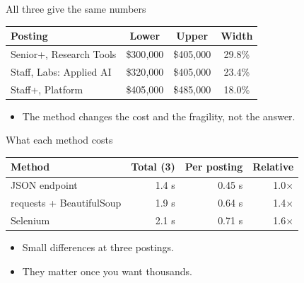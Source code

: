 \documentclass[11pt,aspectratio=169]{beamer}
\newenvironment{wideitemize}
  {\begin{itemize}\setlength{\itemsep}{10pt}}
  {\end{itemize}}
\begin{document}
\begin{frame}{All three give the same numbers}
\begin{table}
\centering\small
\begin{tabular}{lccc}
\toprule
Posting & Lower & Upper & Width \\
\midrule
Senior+, Research Tools & \$300{,}000 & \$405{,}000 & 29.8\% \\
Staff, Labs: Applied AI & \$320{,}000 & \$405{,}000 & 23.4\% \\
Staff+, Platform        & \$405{,}000 & \$485{,}000 & 18.0\% \\
\bottomrule
\end{tabular}
\end{table}

\vspace{0.5em}
\begin{wideitemize}
  \item The method changes the cost and the fragility, not the answer.
\end{wideitemize}
\end{frame}

\begin{frame}{What each method costs}
\begin{table}
\centering\small
\begin{tabular}{lrrr}
\toprule
Method & Total (3) & Per posting & Relative \\
\midrule
JSON endpoint            & 1.4 s & 0.45 s & 1.0$\times$ \\
requests + BeautifulSoup & 1.9 s & 0.64 s & 1.4$\times$ \\
Selenium                 & 2.1 s & 0.71 s & 1.6$\times$ \\
\bottomrule
\end{tabular}
\end{table}

\vspace{0.5em}
\begin{wideitemize}
  \item Small differences at three postings.
  \item They matter once you want thousands.
\end{wideitemize}
\end{frame}
\end{document}
